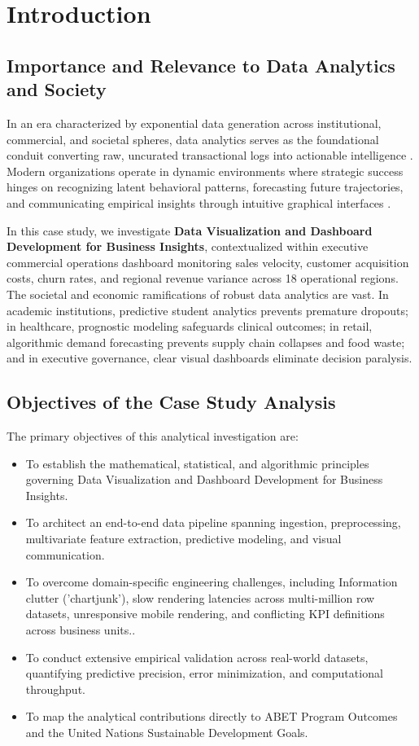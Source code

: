 \section{Introduction}

\subsection{Importance and Relevance to Data Analytics and Society}
In an era characterized by exponential data generation across institutional, commercial, and societal spheres, data analytics serves as the foundational conduit converting raw, uncurated transactional logs into actionable intelligence \cite{provost2013data}. Modern organizations operate in dynamic environments where strategic success hinges on recognizing latent behavioral patterns, forecasting future trajectories, and communicating empirical insights through intuitive graphical interfaces \cite{han2011data}.

In this case study, we investigate \textbf{Data Visualization and Dashboard Development for Business Insights}, contextualized within executive commercial operations dashboard monitoring sales velocity, customer acquisition costs, churn rates, and regional revenue variance across 18 operational regions. The societal and economic ramifications of robust data analytics are vast. In academic institutions, predictive student analytics prevents premature dropouts; in healthcare, prognostic modeling safeguards clinical outcomes; in retail, algorithmic demand forecasting prevents supply chain collapses and food waste; and in executive governance, clear visual dashboards eliminate decision paralysis.

\subsection{Objectives of the Case Study Analysis}
The primary objectives of this analytical investigation are:
\begin{itemize}
  \item To establish the mathematical, statistical, and algorithmic principles governing Data Visualization and Dashboard Development for Business Insights.
  \item To architect an end-to-end data pipeline spanning ingestion, preprocessing, multivariate feature extraction, predictive modeling, and visual communication.
  \item To overcome domain-specific engineering challenges, including Information clutter ('chartjunk'), slow rendering latencies across multi-million row datasets, unresponsive mobile rendering, and conflicting KPI definitions across business units..
  \item To conduct extensive empirical validation across real-world datasets, quantifying predictive precision, error minimization, and computational throughput.
  \item To map the analytical contributions directly to ABET Program Outcomes and the United Nations Sustainable Development Goals.
\end{itemize}
